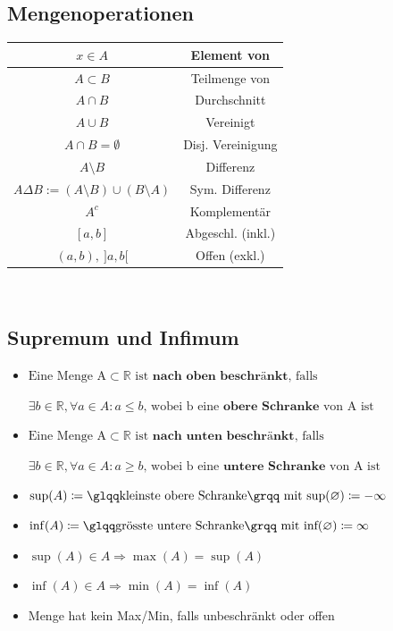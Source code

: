 \documentclass[8pt, a4paper, landscape, fleqn]{scrartcl}
\def\R{\mathbb{R}}
\begin{document}
\begin{multicols*}{3}
		    \subsection{Mengenoperationen}
		        	\begin{tabular}{|c|c|}
						\hline
						$x\in A$ & Element von\\
						\hline
						$A\subset B$ &  Teilmenge von\\
						\hline
						$A\cap B$ & Durchschnitt\\
						\hline
						$A\cup B$ & Vereinigt \\
						\hline
						$A\cap B = \emptyset$ & Disj. Vereinigung \\
						\hline
						$A \setminus B$ & Differenz \\
						\hline
						$A \Delta B := (A \setminus B)\cup (B \setminus A)$ & Sym. Differenz \\
						\hline
						$A^c$ & Komplementär \\
						\hline
						$[a,b]$ & Abgeschl. (inkl.) \\
						\hline
						$(a,b), \ ]a,b[$ & Offen (exkl.) \\
						\hline
					\end{tabular}\\
			\subsection{Supremum und Infimum}
				 \begin{itemize}
				    \item $\text{Eine Menge A} \subset \R \text{ ist } \textbf{nach oben beschränkt} \text{, falls  }$
				    
				    $\exists b \in \R, \forall a \in A : a \leq b \text{,  wobei b eine } \textbf{obere Schranke } \text{von A ist}$
				    \item $\text{Eine Menge A} \subset \R \text{ ist } \textbf{nach unten beschränkt} \text{, falls  }$
				    
				    $\exists b \in \R, \forall a \in A : a \geq b \text{,  wobei b eine } \textbf{untere Schranke } \text{von A ist}$
				 	\item $\sup(A) \coloneqq \glqq \text{kleinste obere Schranke\grqq}  \text{ mit }\text{sup}(\varnothing) \coloneqq -\infty$
				 	\item $\inf(A) \coloneqq \glqq \text{grösste untere Schranke\grqq} \text{ mit }\text{inf}(\varnothing) \coloneqq \infty$
				    \item $\sup(A) \in A \Rightarrow \max (A) = \sup (A)$ 
                    \item $\inf (A) \in A \Rightarrow \min(A) = \inf (A)$
                    \item Menge hat kein Max/Min, falls unbeschränkt oder offen
				\end{itemize}
                

\end{multicols*}
\end{document}
